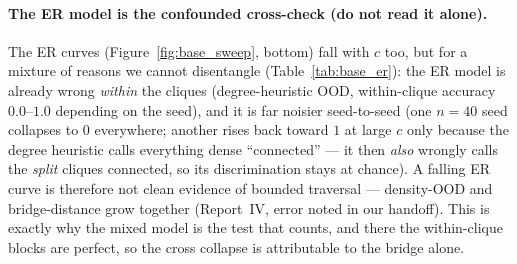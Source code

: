 \documentclass[11pt,a4paper]{article}
\begin{document}
\paragraph{The ER model is the confounded cross-check (do not read it alone).} The ER curves
(Figure~\ref{fig:base_sweep}, bottom) fall with $c$ too, but for a mixture of reasons we cannot
disentangle (Table~\ref{tab:base_er}): the ER model is already wrong \emph{within} the cliques
(degree-heuristic OOD, within-clique accuracy $0.0$--$1.0$ depending on the seed), and it is far
noisier seed-to-seed
(one $n{=}40$ seed collapses to $0$ everywhere; another rises back toward $1$ at large $c$ only
because the degree heuristic calls everything dense ``connected'' --- it then \emph{also} wrongly
calls the \emph{split} cliques connected, so its discrimination stays at chance). A falling ER
curve is therefore not clean evidence of bounded traversal --- density-OOD and bridge-distance
grow together (Report~IV, error noted in our handoff). This is exactly why the mixed model is the
test that counts, and there the within-clique blocks are perfect, so the cross collapse is
attributable to the bridge alone.
\end{document}
